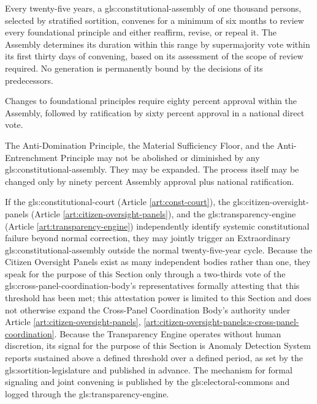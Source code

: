 
Every twenty-five years, a \gls{gls:constitutional-assembly} of one thousand persons, selected by stratified sortition, convenes for a minimum of six months to review every foundational principle and either reaffirm, revise, or repeal it. The Assembly determines its duration within this range by supermajority vote within its first thirty days of convening, based on its assessment of the scope of review required. No generation is permanently bound by the decisions of its predecessors.

Changes to foundational principles require eighty percent approval within the Assembly, followed by ratification by sixty percent approval in a national direct vote.

The Anti-Domination Principle, the Material Sufficiency Floor, and the Anti-Entrenchment Principle may not be abolished or diminished by any \gls{gls:constitutional-assembly}. They may be expanded. The process itself may be changed only by ninety percent Assembly approval plus national ratification.

If the \gls{gls:constitutional-court} (Article \ref{art:const-court}), the \gls{gls:citizen-oversight-panels} (Article \ref{art:citizen-oversight-panels}), and the \gls{gls:transparency-engine} (Article \ref{art:transparency-engine}) independently identify systemic constitutional failure beyond normal correction, they may jointly trigger an Extraordinary \gls{gls:constitutional-assembly} outside the normal twenty-five-year cycle. Because the Citizen Oversight Panels exist as many independent bodies rather than one, they speak for the purpose of this Section only through a two-thirds vote of the \gls{gls:cross-panel-coordination-body}'s representatives formally attesting that this threshold has been met; this attestation power is limited to this Section and does not otherwise expand the Cross-Panel Coordination Body's authority under Article \ref{art:citizen-oversight-panels}, \ref{art:citizen-oversight-panels:s-cross-panel-coordination}. Because the Transparency Engine operates without human discretion, its signal for the purpose of this Section is Anomaly Detection System reports sustained above a defined threshold over a defined period, as set by the \gls{gls:sortition-legislature} and published in advance. The mechanism for formal signaling and joint convening is published by the \gls{gls:electoral-commons} and logged through the \gls{gls:transparency-engine}.